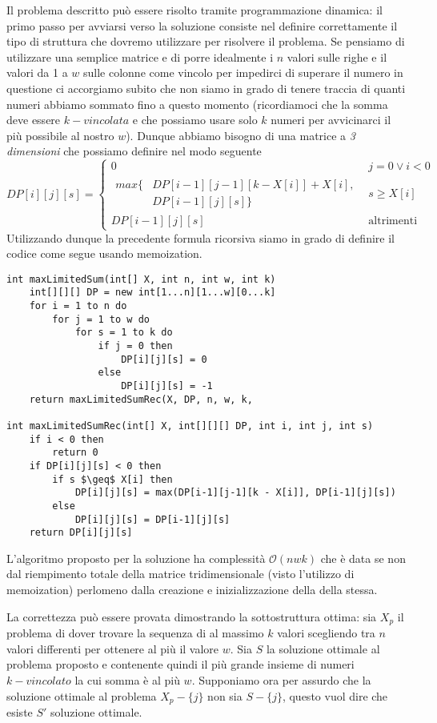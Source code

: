 \documentclass[../cheatSheetAlgoritmi.tex]{subfiles}
\begin{document}
Il problema descritto può essere risolto tramite programmazione dinamica: il primo passo per avviarsi verso la soluzione consiste nel definire correttamente il tipo di struttura che dovremo utilizzare per risolvere il problema. Se pensiamo di utilizzare una semplice matrice e di porre idealmente i $n$ valori sulle righe e il valori da 1 a $w$ sulle colonne come vincolo per impedirci di superare il numero in questione ci accorgiamo subito che non siamo in grado di tenere traccia di quanti numeri abbiamo sommato fino a questo momento (ricordiamoci che la somma deve essere $k-vincolata$ e che possiamo usare solo $k$ numeri per avvicinarci il più possibile al nostro $w$). Dunque abbiamo bisogno di una matrice a \emph{3 dimensioni} che possiamo definire nel modo seguente
\begin{equation*}
  	DP[i][j][s]=\begin{cases}
		  0 & \text{$j = 0 \lor i < 0$}\\
		  \begin{aligned}
			max\{ &
			DP[i-1][j-1][k - X[i]] + X[i],\\ &
			DP[i-1][j][s]\}
		  \end{aligned} & \text{$s \geq X[i]$}\\
    	DP[i-1][j][s] & \text{altrimenti}
  	\end{cases}
\end{equation*}
Utilizzando dunque la precedente formula ricorsiva siamo in grado di definire il codice come segue usando memoization.
\begin{lstlisting}[caption=Somma Massimale (k w)-vincolata]
int maxLimitedSum(int[] X, int n, int w, int k)
	int[][][] DP = new int[1...n][1...w][0...k]
	for i = 1 to n do
		for j = 1 to w do
			for s = 1 to k do
				if j = 0 then 
					DP[i][j][s] = 0
				else 
					DP[i][j][s] = -1
	return maxLimitedSumRec(X, DP, n, w, k, 

int maxLimitedSumRec(int[] X, int[][][] DP, int i, int j, int s)
	if i < 0 then
		return 0
	if DP[i][j][s] < 0 then
		if s $\geq$ X[i] then
			DP[i][j][s] = max(DP[i-1][j-1][k - X[i]], DP[i-1][j][s])
		else
			DP[i][j][s] = DP[i-1][j][s]
	return DP[i][j][s]
\end{lstlisting}
L'algoritmo proposto per la soluzione ha complessità $\mathcal{O}(nwk)$ che è data se non dal riempimento totale della matrice tridimensionale (visto l'utilizzo di memoization) perlomeno dalla creazione e inizializzazione della della stessa.

La correttezza può essere provata dimostrando la sottostruttura ottima: sia $X_{p}$ il problema di dover trovare la sequenza di al massimo $k$ valori scegliendo tra $n$ valori differenti per ottenere al più il valore $w$. Sia $S$ la soluzione ottimale al problema proposto e contenente quindi il più grande insieme di numeri $k-vincolato$ la cui somma è al più $w$. Supponiamo ora per assurdo che la soluzione ottimale al problema $X_{p} - \{j\}$ non sia $S - \{j\}$, questo vuol dire che esiste $S'$ soluzione ottimale.
\end{document}

